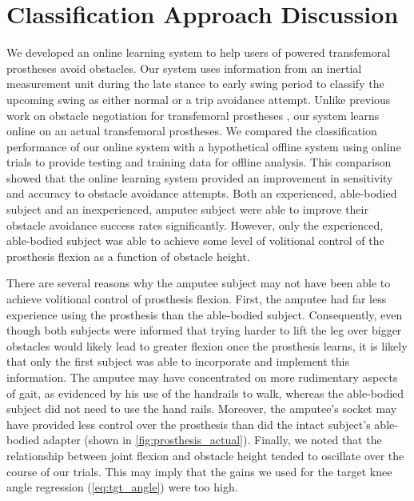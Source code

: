 \section{Classification Approach Discussion}

We developed an online learning system to help users of powered transfemoral
prostheses avoid obstacles. Our system uses information from an inertial
measurement unit during the late stance to early swing period to classify the
upcoming swing as either normal or a trip avoidance attempt. Unlike previous
work on obstacle negotiation for transfemoral prostheses
\citep{lawson2010stumble, zhang2011towards, shirota2014recovery}, our system
learns online on an actual transfemoral prostheses. We compared the
classification performance of our online system with a hypothetical offline
system using online trials to provide testing and training data for offline
analysis. This comparison showed that the online learning system provided an
improvement in sensitivity and accuracy to obstacle avoidance attempts. Both an
experienced, able-bodied subject and an inexperienced, amputee subject were able
to improve their obstacle avoidance success rates significantly. However, only
the experienced, able-bodied subject was able to achieve some level of
volitional control of the prosthesis flexion as a function of obstacle height.
                                  
There are several reasons why the amputee subject may not have been able to
achieve volitional control of prosthesis flexion. First, the amputee had far
less experience using the prosthesis than the able-bodied subject. Consequently,
even though both subjects were informed that trying harder to lift the leg over
bigger obstacles would likely lead to greater flexion once the prosthesis
learns, it is likely that only the first subject was able to incorporate and
implement this information. The amputee may have concentrated on more
rudimentary aspects of gait, as evidenced by his use of the handrails to walk,
whereas the able-bodied subject did not need to use the hand rails. Moreover,
the amputee's socket may have provided less control over the prosthesis than did
the intact subject's able-bodied adapter (shown in
\cref{fig:prosthesis_actual}).  Finally, we noted that the relationship between
joint flexion and obstacle height tended to oscillate over the course of our
trials. This may imply that the gains we used for the target knee angle
regression (\cref{eq:tgt_angle}) were too high.


